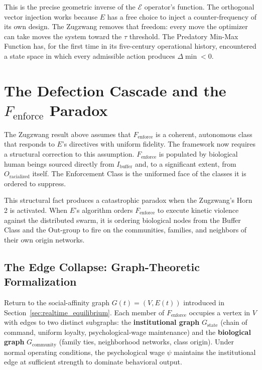 This is the precise geometric inverse of the $\mathcal{E}$ operator's function. The orthogonal vector injection works because $E$ has a free choice to inject a counter-frequency of its own design. The Zugzwang removes that freedom: every move the optimizer can take moves the system toward the $\tau$ threshold. The Predatory Min-Max Function has, for the first time in its five-century operational history, encountered a state space in which every admissible action produces $\Delta\min < 0$.

\section{The Defection Cascade and the \texorpdfstring{$F_{\text{enforce}}$}{F\_enforce} Paradox}
\label{sec:defection_cascade}

The Zugzwang result above assumes that $F_{\text{enforce}}$ is a coherent, autonomous class that responds to $E$'s directives with uniform fidelity. The framework now requires a structural correction to this assumption. $F_{\text{enforce}}$ is populated by biological human beings sourced directly from $I_{\text{buffer}}$ and, to a significant extent, from $O_{\text{racialized}}$ itself. The Enforcement Class is the uniformed face of the classes it is ordered to suppress.

This structural fact produces a catastrophic paradox when the Zugzwang's Horn 2 is activated. When $E$'s algorithm orders $F_{\text{enforce}}$ to execute kinetic violence against the distributed swarm, it is ordering biological nodes from the Buffer Class and the Out-group to fire on the communities, families, and neighbors of their own origin networks.

\subsection{The Edge Collapse: Graph-Theoretic Formalization}

Return to the social-affinity graph $G(t) = (V, E(t))$ introduced in Section~\ref{sec:realtime_equilibrium}. Each member of $F_{\text{enforce}}$ occupies a vertex in $V$ with edges to two distinct subgraphs: the \textbf{institutional graph} $G_{\text{state}}$ (chain of command, uniform loyalty, psychological-wage maintenance) and the \textbf{biological graph} $G_{\text{community}}$ (family ties, neighborhood networks, class origin). Under normal operating conditions, the psychological wage $\psi$ maintains the institutional edge at sufficient strength to dominate behavioral output.

